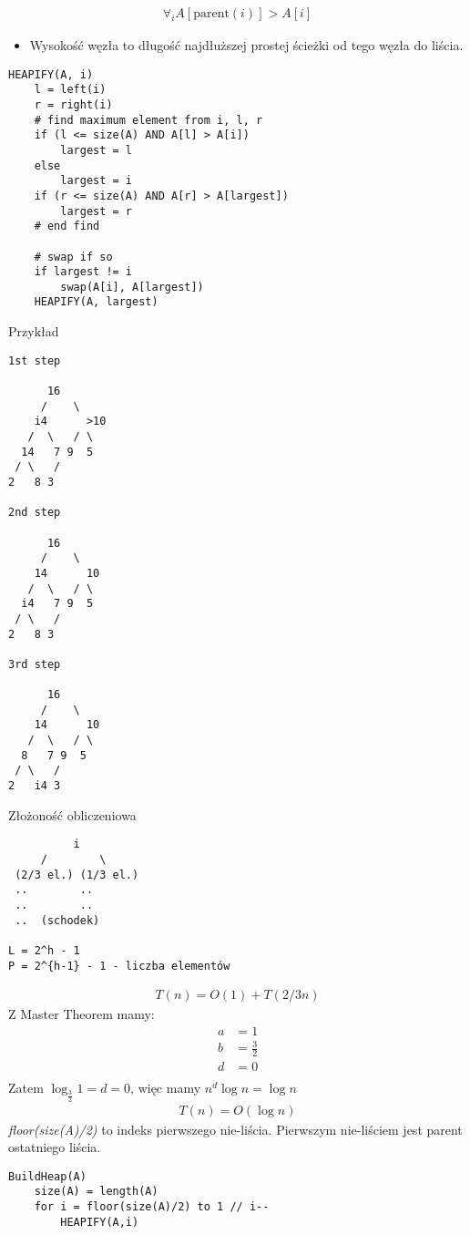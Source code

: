\documentclass{article}
\numberwithin{equation}{subsection}
\begin{document}
\begin{align}
    \forall_i A[\text{parent}(i)] > A[i]
\end{align}

\begin{itemize}
    \item Wysokość węzła to długość najdłuższej prostej ścieżki od tego węzła do liścia.
\end{itemize}

\begin{verbatim}
HEAPIFY(A, i)
    l = left(i)
    r = right(i)
    # find maximum element from i, l, r
    if (l <= size(A) AND A[l] > A[i]) 
        largest = l
    else
        largest = i
    if (r <= size(A) AND A[r] > A[largest])
        largest = r
    # end find

    # swap if so
    if largest != i
        swap(A[i], A[largest])
    HEAPIFY(A, largest)
\end{verbatim}
Przykład
\begin{verbatim}
1st step 

      16
     /    \
    i4      >10
   /  \   / \ 
  14   7 9  5
 / \   /
2   8 3

2nd step

      16
     /    \
    14      10
   /  \   / \ 
  i4   7 9  5
 / \   /
2   8 3

3rd step

      16
     /    \
    14      10
   /  \   / \ 
  8   7 9  5
 / \   /
2   i4 3
\end{verbatim}
Złożoność obliczeniowa

\begin{verbatim}
          i
     /        \
 (2/3 el.) (1/3 el.)
 ..        ..
 ..        ..
 ..  (schodek)
    
L = 2^h - 1
P = 2^{h-1} - 1 - liczba elementów
\end{verbatim}

\begin{align}
    T(n) = O(1) + T(2/3 n)
\end{align}
Z Master Theorem mamy:
\begin{align}
    a &= 1\\
    b &= \frac{3}{2}\\
    d &= 0\\
\end{align}
Zatem $\log_{\frac{3}{2}} 1 = d = 0$, więc mamy $n^d \log n = \log n$
\begin{align}
    T(n) = O(\log n)
\end{align}
\textit{floor(size(A)/2)} to indeks pierwszego nie-liścia. Pierwszym nie-liściem jest parent ostatniego liścia.
\begin{verbatim}
BuildHeap(A)
    size(A) = length(A)
    for i = floor(size(A)/2) to 1 // i--
        HEAPIFY(A,i)
\end{verbatim}
\end{document}

